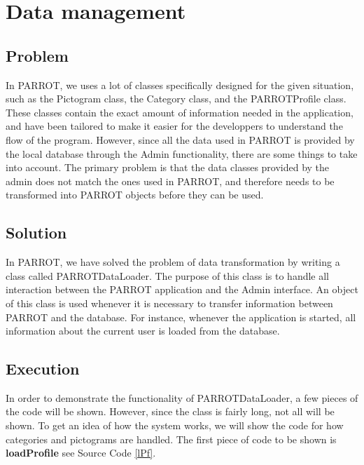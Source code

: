 \section{Data management}
\subsection*{Problem}
In PARROT, we uses a lot of classes specifically designed for the given situation, such as the Pictogram class, the Category class, and the PARROTProfile class.
These classes contain the exact amount of information needed in the application, and have been tailored to make it easier for the developpers to understand the flow of the program. However, since all the data used in PARROT is provided by the local database through the Admin functionality, there are some things to take into account.
The primary problem is that the data classes provided by the admin does not match the ones used in PARROT, and therefore needs to be transformed into PARROT objects before they can be used.

\subsection*{Solution}
In PARROT, we have solved the problem of data transformation by writing a class called PARROTDataLoader. The purpose of this class is to handle all interaction between the PARROT application and the Admin interface. An object of this class is used whenever it is necessary to transfer information between PARROT and the database. For instance, whenever the application is started, all information about the current user is loaded from the database.

\subsection*{Execution}
In order to demonstrate the functionality of PARROTDataLoader, a few pieces of the code will be shown. However, since the class is fairly long, not all will be shown. To get an idea of how the system works, we will show the code for how categories and pictograms are handled.\newline
The first piece of code to be shown is \textbf{loadProfile} see Source Code \ref{lPf}.

